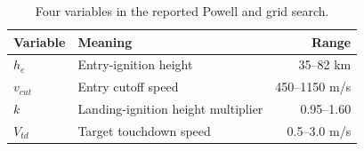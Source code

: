 \begin{table}[htbp]
\caption{Four variables in the reported Powell and grid search.}
\label{tab:src14}
\small
\setlength{\tabcolsep}{3.5pt}
\begin{tabularx}{\linewidth}{@{}lXr@{}}
\toprule
Variable & Meaning & Range \\
\midrule
$h_e$ & Entry-ignition height & 35--82 km \\
$v_{cut}$ & Entry cutoff speed & 450--1150 m/s \\
$k$ & Landing-ignition height multiplier & 0.95--1.60 \\
$V_{td}$ & Target touchdown speed & 0.5--3.0 m/s \\
\bottomrule
\end{tabularx}
\end{table}
